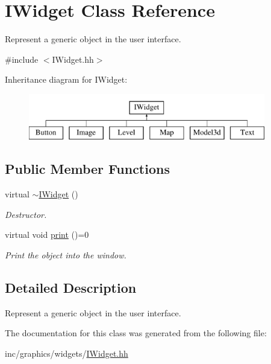 \hypertarget{classIWidget}{}\section{I\+Widget Class Reference}
\label{classIWidget}


Represent a generic object in the user interface.  




{\ttfamily \#include $<$I\+Widget.\+hh$>$}

Inheritance diagram for I\+Widget\+:\begin{figure}[H]
\begin{center}
\leavevmode
\includegraphics[height=2.000000cm]{classIWidget}
\end{center}
\end{figure}
\subsection*{Public Member Functions}
\begin{DoxyCompactItemize}
\item 
\mbox{\label{classIWidget_ad733ed972c58c5c6268b57e2f4381666}} 
virtual \hyperlink{classIWidget_ad733ed972c58c5c6268b57e2f4381666}{$\sim$\+I\+Widget} ()
\begin{DoxyCompactList}\small\item\em Destructor. \end{DoxyCompactList}\item 
\mbox{\label{classIWidget_ad59738ae1350ed490fdbe07cd1ab4daa}} 
virtual void \hyperlink{classIWidget_ad59738ae1350ed490fdbe07cd1ab4daa}{print} ()=0
\begin{DoxyCompactList}\small\item\em Print the object into the window. \end{DoxyCompactList}\end{DoxyCompactItemize}


\subsection{Detailed Description}
Represent a generic object in the user interface. 

The documentation for this class was generated from the following file\+:\begin{DoxyCompactItemize}
\item 
inc/graphics/widgets/\hyperlink{IWidget_8hh}{I\+Widget.\+hh}\end{DoxyCompactItemize}
